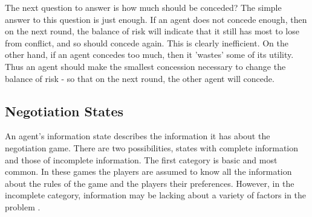 The next question to answer is how much should be conceded? The simple
answer to this question is just enough. If an agent does not concede enough, then
on the next round, the balance of risk will indicate that it still has most to lose
from conflict, and so should concede again. This is clearly inefficient. On the other
hand, if an agent concedes too much, then it 'wastes' some of its utility. Thus an
agent should make the smallest concession necessary to change the balance of
risk - so that on the next round, the other agent will concede.


\subsection{Negotiation States}
An agent’s information state describes the information it has about the negotiation game. There are two possibilities, states with complete information and those of incomplete information. The first category is basic and most common. In these games the players are assumed to know all the information about the rules of the game and the players their preferences. However, in the incomplete category, information may be lacking about a variety of factors in the problem \citep{fatima2004agenda}. %


